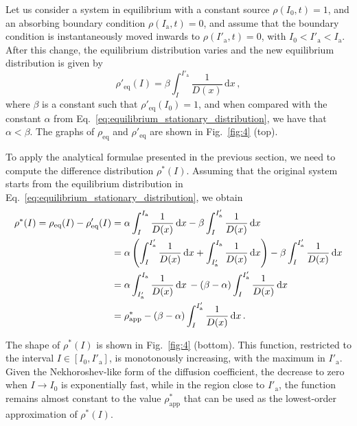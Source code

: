 
Let us consider a system in equilibrium with a constant  source $\rho(I_0, t)=1$, and an absorbing boundary condition $\rho(I_\mathrm{a}, t)=0$, and assume that the boundary condition is instantaneously moved inwards to $\rho(I'_\mathrm{a}, t)=0$, with $I_0 < I'_\mathrm{a} < I_\mathrm{a}$. After this change, the equilibrium distribution varies and the new equilibrium distribution is given by
\begin{equation}
    \rho'_\text{eq}(I) = \beta \int_I^{I'_\mathrm{a}} \frac{1}{D(x)}\,\mathrm{d}x\,,
\end{equation}
where $\beta$ is a constant such  that $\rho'_\text{eq}(I_0)=1$, and when compared with the constant $\alpha$ from Eq.~\eqref{eq:equilibrium_stationary_distribution}, we have that $\alpha < \beta$. The graphs of $\rho_\mathrm{eq}$ and $\rho'_\mathrm{eq}$ are shown in Fig.~\ref{fig:4} (top).

To apply the analytical formulae presented in the previous section, we need to compute the difference distribution $\rho^\ast(I)$. Assuming that the original system starts from the equilibrium distribution in Eq.~\eqref{eq:equilibrium_stationary_distribution}, we obtain 
\begin{align}
    \rho^\ast(I) = \rho_\text{eq}(I) - \rho'_\text{eq}(I) 
    &= \alpha \int_I^{I_\mathrm{a}} \frac{1}{D(x)}\,\mathrm{d}x - \beta \int_I^{I'_\mathrm{a}} \frac{1}{D(x)}\,\mathrm{d}x \notag \\
    &= \alpha \left( 
          \int_{I}^{I'_\mathrm{a}} \frac{1}{D(x)}\,\mathrm{d}x 
        + \int_{I'_\mathrm{a}}^{I_\mathrm{a}} \frac{1}{D(x)}\,\mathrm{d}x \right) - \beta \int_I^{I'_\mathrm{a}} \frac{1}{D(x)}\,\mathrm{d}x \notag \\
    &=  \alpha \int_{I'_\mathrm{a}}^{I_\mathrm{a}} \frac{1}{D(x)}\,\mathrm{d}x \, - (\beta - \alpha) \int_{I}^{I'_\mathrm{a}} \frac{1}{D(x)}\,\mathrm{d}x \notag \\
    &=  \rho^\ast_\text{app} - (\beta - \alpha) \int_{I}^{I'_\mathrm{a}} \frac{1}{D(x)}\,\mathrm{d}x \, .
    \label{eq:inward_difference}
\end{align}

The shape of $\rho^\ast(I)$ is shown in Fig.~\ref{fig:4} (bottom). This function, restricted to the interval $I \in [I_0, I'_\mathrm{a}]$, is monotonously increasing, with the maximum in $I'_\mathrm{a}$. Given the  Nekhoroshev-like form of the diffusion coefficient, the decrease to zero when $I \to I_0$ is exponentially fast, while in the region close to $I'_\mathrm{a}$, the function remains almost constant to the value  $\rho^\ast_\text{app}$ that can be used as the lowest-order approximation of $\rho^\ast(I)$.

